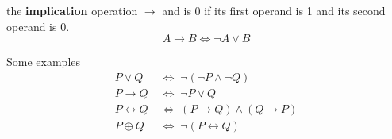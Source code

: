 the \textbf{implication} operation $\rightarrow$ and is 0 if its first operand is 1 and its second operand is 0.
\[
A \rightarrow B \Leftrightarrow \neg A \vee	B
\]

Some examples
\begin{align*}
P \vee Q 			& \; \Leftrightarrow \; \neg(\neg P \wedge \neg Q) \\
P \rightarrow Q 	& \; \Leftrightarrow \; \neg P \vee Q \\
P \leftrightarrow Q & \; \Leftrightarrow \; (P \rightarrow Q) \wedge (Q \rightarrow P) \\
P \oplus Q 			& \; \Leftrightarrow \; \neg(P \leftrightarrow Q)
\end{align*}

